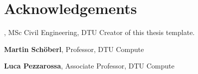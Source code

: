 \section*{Acknowledgements}
\textbf{\thesisauthor}, MSc Civil Engineering, DTU \newline
Creator of this thesis template.

\textbf{Martin Schöberl}, Professor, DTU Compute \newline
[text]

\textbf{Luca Pezzarossa}, Associate Professor, DTU Compute \newline
[text]

